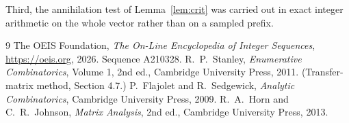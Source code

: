 \documentclass[11pt,a4paper]{article}
\theoremstyle{plain}
\theoremstyle{definition}
\begin{document}
Third, the annihilation test of Lemma~\ref{lem:crit} was carried out in exact integer
arithmetic on the whole vector rather than on a sampled prefix.

\begin{thebibliography}{9}
 The OEIS Foundation, \emph{The On-Line Encyclopedia of Integer
Sequences}, \url{https://oeis.org}, 2026. Sequence A210328.
 R.~P.~Stanley, \emph{Enumerative Combinatorics}, Volume 1, 2nd ed.,
Cambridge University Press, 2011. (Transfer-matrix method, Section 4.7.)
 P.~Flajolet and R.~Sedgewick, \emph{Analytic Combinatorics}, Cambridge
University Press, 2009.
 R.~A.~Horn and C.~R.~Johnson, \emph{Matrix Analysis}, 2nd ed., Cambridge
University Press, 2013.
\end{thebibliography}
\end{document}
